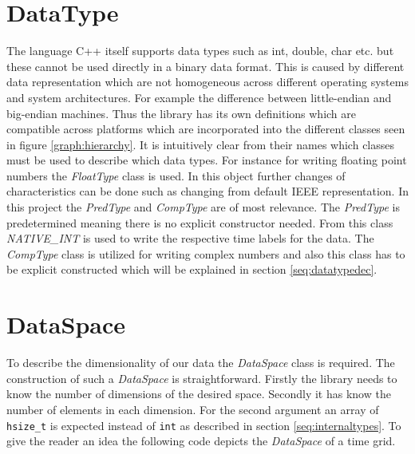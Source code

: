\section{DataType}
\label{seq:datatype}
The language C++ itself supports data types such as int, double, char etc. but these cannot be used directly in a binary data format.
This is caused by different data representation which are not homogeneous across different operating systems and system architectures. For example the difference between little-endian and big-endian machines. Thus the library has its own definitions which are compatible across platforms which are incorporated into the different classes seen in figure \ref{graph:hierarchy}. It is intuitively clear from their names which classes must be used to describe which data types. For instance for writing floating point numbers the \textit{FloatType} class is used. In this object further changes of characteristics can be done such as changing from default IEEE representation. In this project the \textit{PredType} and \textit{CompType} are of most relevance. The \textit{PredType} is predetermined meaning there is no explicit constructor needed. From this class \textit{NATIVE\_INT} is used to write the respective time labels for the data. The \textit{CompType} class is utilized for writing complex numbers and also this class has to be explicit constructed which will be explained in section \ref{seq:datatypedec}.

\section{DataSpace}
\label{seq:dataspace}
To describe the dimensionality of our data the \textit{DataSpace} class is required. The construction of such a \textit{DataSpace} is straightforward. Firstly the library needs to know the number of dimensions of the desired space. Secondly it has know the number of elements in each dimension. For the second argument an array of \texttt{hsize\_t} is expected instead of \texttt{int} as described in section \ref{seq:internaltypes}. To give the reader an idea the following code depicts the \textit{DataSpace} of a time grid.

